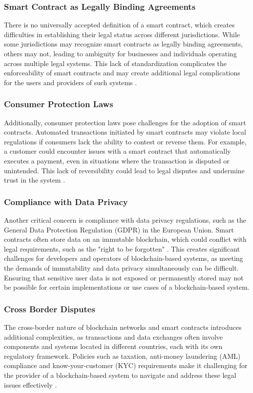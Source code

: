 \subsubsection{Smart Contract as Legally Binding Agreements}
There is no universally accepted definition of a smart contract, which creates difficulties in establishing their legal status across different jurisdictions. While some jurisdictions may recognize smart contracts as legally binding agreements, others may not, leading to ambiguity for businesses and individuals operating across multiple legal systems. This lack of standardization complicates the enforceability of smart contracts and may create additional legal complications for the users and providers of such systems \autocite{Mik2017Smart}.

\subsubsection{Consumer Protection Laws}
Additionally, consumer protection laws pose challenges for the adoption of smart contracts. Automated transactions initiated by smart contracts may violate local regulations if consumers lack the ability to contest or reverse them. For example, a customer could encounter issues with a smart contract that automatically executes a payment, even in situations where the transaction is disputed or unintended. This lack of reversibility could lead to legal disputes and undermine trust in the system \autocite{ferreira2021regulating}.

\subsubsection{Compliance with Data Privacy}
Another critical concern is compliance with data privacy regulations, such as the General Data Protection Regulation (GDPR) in the European Union. Smart contracts often store data on an immutable blockchain, which could conflict with legal requirements, such as the "right to be forgotten" \autocite{mantelero2013eu}. This creates significant challenges for developers and operators of blockchain-based systems, as meeting the demands of immutability and data privacy simultaneously can be difficult. Ensuring that sensitive user data is not exposed or permanently stored may not be possible for certain implementations or use cases of a blockchain-based system.

\subsubsection{Cross Border Disputes}
The cross-border nature of blockchain networks and smart contracts introduces additional complexities, as transactions and data exchanges often involve components and systems located in different countries, each with its own regulatory framework. Policies such as taxation, anti-money laundering (AML) compliance and know-your-customer (KYC) requirements make it challenging for the provider of a blockchain-based system to navigate and address these legal issues effectively \autocites{Spafford2019Blockchain}{Li2023Cross-Border}.

